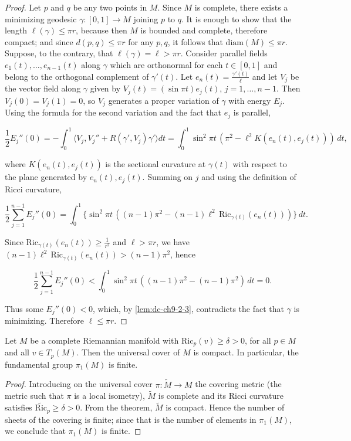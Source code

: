 \begin{proof}
  \sketch
  Let $p$ and $q$ be any two points in $M$. Since $M$ is complete, there
  exists a minimizing geodesic $\gamma:[0,1]\to M$ joining $p$ to $q$. It is enough
  to show that the length $\ell(\gamma)\le\pi r$, because then $M$ is bounded and
  complete, therefore compact; and since $d(p,q)\le\pi r$ for any $p,q$, it follows
  that $\mathrm{diam}(M)\le\pi r$. Suppose, to the contrary, that
  $\ell(\gamma)=\ell>\pi r$. Consider parallel fields $e_1(t),\dots,e_{n-1}(t)$ along
  $\gamma$ which are orthonormal for each $t\in[0,1]$ and belong to the orthogonal
  complement of $\gamma'(t)$. Let $e_n(t)=\frac{\gamma'(t)}{\ell}$ and let $V_j$ be
  the vector field along $\gamma$ given by $V_j(t)=(\sin\pi t)e_j(t)$,
  $j=1,\dots,n-1$. Then $V_j(0)=V_j(1)=0$, so $V_j$ generates a proper variation of
  $\gamma$ with energy $E_j$. Using the formula for the second variation and the fact
  that $e_j$ is parallel,

  $$
  \frac{1}{2}E_j''(0)=-\int_0^1\langle V_j,V_j''+R(\gamma',V_j)\gamma'\rangle dt=\int_0^1\sin^2\pi t\,(\pi^2-\ell^2 K(e_n(t),e_j(t)))\,dt,
  $$

  where $K(e_n(t),e_j(t))$ is the sectional curvature at $\gamma(t)$ with respect to
  the plane generated by $e_n(t),e_j(t)$. Summing on $j$ and using the definition of
  Ricci curvature,

  $$
  \frac{1}{2}\sum_{j=1}^{n-1}E_j''(0)=\int_0^1\{\sin^2\pi t\,((n-1)\pi^2-(n-1)\ell^2\,\mathrm{Ric}_{\gamma(t)}(e_n(t)))\}\,dt.
  $$

  Since $\mathrm{Ric}_{\gamma(t)}(e_n(t))\ge\frac{1}{r^2}$ and $\ell>\pi r$, we have
  $(n-1)\ell^2\,\mathrm{Ric}_{\gamma(t)}(e_n(t))>(n-1)\pi^2$, hence

  $$
  \frac{1}{2}\sum_{j=1}^{n-1}E_j''(0)<\int_0^1\sin^2\pi t\,((n-1)\pi^2-(n-1)\pi^2)\,dt=0.
  $$

  Thus some $E_j''(0)<0$, which, by \cref{lem:dc-ch9-2-3},
  contradicts the fact that $\gamma$ is minimizing. Therefore $\ell\le\pi r$.
\end{proof}
\begin{corollary}
  \label{cor:dc-ch9-3-2}
  Let $M$ be a complete Riemannian manifold with $\mathrm{Ric}_p(v)\ge\delta>0$, for
  all $p\in M$ and all $v\in T_p(M)$. Then the universal cover of $M$ is compact. In
  particular, the fundamental group $\pi_1(M)$ is finite.
\end{corollary}
\begin{proof}
  \sketch
  Introducing on the universal cover $\pi:\tilde M\to M$ the covering metric
  (the metric such that $\pi$ is a local isometry), $\tilde M$ is complete and its
  Ricci curvature satisfies $\widetilde{\mathrm{Ric}}_p\ge\delta>0$. From the theorem,
  $\tilde M$ is compact. Hence the number of sheets of the covering is finite; since
  that is the number of elements in $\pi_1(M)$, we conclude that $\pi_1(M)$ is
  finite.
\end{proof}
